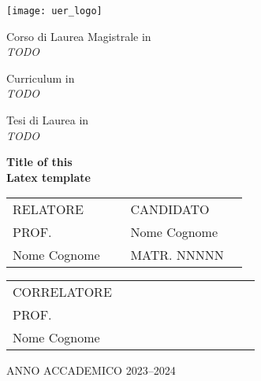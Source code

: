 

\begin{titlepage}
    \begin{center}
        \fontsize{18}{30}\selectfont

        \texttt{[image: uer\_logo]}

        \vspace{1cm}

        Corso di Laurea Magistrale in\\
        \textit{TODO}

        \vspace{1cm}

        Curriculum in \\
        \textit{TODO}

        \vspace{1cm}

        Tesi di Laurea in\\
        \textit{TODO}

        \vspace{2.5cm}

        \huge \textbf{Title of this\\Latex template}

    \end{center}
    \begin{center}
        \fontsize{13}{20}\selectfont

        \vspace{2.5cm}

        \begin{tabular}{p{0.45\linewidth} >{\raggedleft\arraybackslash}p{0.45\linewidth}}
            \fontsize{13}{20}\selectfont RELATORE   & \fontsize{13}{20}\selectfont CANDIDATO   \\
            \fontsize{13}{20}\selectfont PROF.      & \fontsize{13}{20}\selectfont Nome Cognome \\
            \fontsize{13}{20}\selectfont Nome Cognome & \fontsize{13}{20}\selectfont MATR. NNNNN
        \end{tabular}

        \vspace{0.75cm}

        \begin{tabular}{p{0.45\linewidth} >{\raggedleft\arraybackslash}p{0.45\linewidth}}
            \fontsize{13}{20}\selectfont CORRELATORE     & \space \\
            \fontsize{13}{20}\selectfont PROF.           & \space \\
            \fontsize{13}{20}\selectfont Nome Cognome & \space
        \end{tabular}

        \vspace{1.5cm}

        ANNO ACCADEMICO 2023--2024
    \end{center}
\end{titlepage}

\restoregeometry
